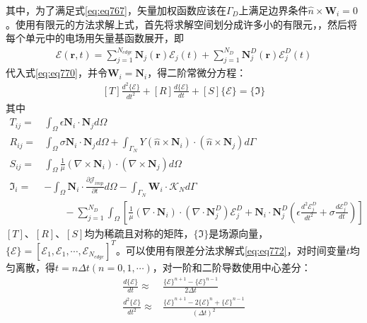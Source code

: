 \documentclass{article}
\numberwithin{equation}{section}
\renewcommand{\vec}[1]{\boldsymbol{#1}}
\begin{document}
其中，为了满足式\ref{eq:eq767}，矢量加权函数应该在$\Gamma_D$上满足边界条件$\hat{n}\times\mathbf{W}_i=0$。使用有限元的方法求解上式，首先将求解空间划分成许多小的有限元，，然后将每个单元中的电场用矢量基函数展开，即
\begin{align}
    \label{eq:eq771}
    \vec{\mathcal{E}}(\vec{r},t)=\sum_{j=1}^{N_{edge}}\mathbf{N}_j(\vec{r})\mathcal{E}_j(t)+\sum_{j=1}^{N_{D}}\mathbf{N}^D_j(\vec{r})\mathcal{E}^D_j(t)
\end{align}
代入式\ref{eq:eq770}，并令$\mathbf{W}_i=\mathbf{N}_i$，得二阶常微分方程：
\begin{align}
    \label{eq:eq772}
    [T]\frac{d^2\{\mathcal{E}\}}{dt^2}+[R]\frac{d\{\mathcal{E}\}}{dt}+[S]\{\mathcal{E}\}=\{\mathfrak{I}\}
\end{align}
其中
\begin{align}
    \label{eq:eq773}
    T_{ij}=&\int_{\Omega}\epsilon\mathbf{N}_i\cdot\mathbf{N}_jd\Omega \\
    \label{eq:eq784}
    R_{ij}=&\int_{\Omega}\sigma\mathbf{N}_i\cdot\mathbf{N}_jd\Omega+\int_{\Gamma_N}Y(\hat{n}\times\mathbf{N}_i)\cdot(\hat{n}\times\mathbf{N}_j)d\Gamma \\
    \label{eq:eq785}
    S_{ij}=&\int_{\Omega}\frac{1}{\mu}(\nabla\times\mathbf{N}_i)\cdot(\nabla\times\mathbf{N}_j)d\Omega \\
    \label{eq:eq786}
    \mathfrak{I}_{i}=&-\int_{\Omega}\mathbf{N}_i\cdot\frac{\partial\vec{\mathcal{J}}_{imp}}{\partial t}d\Omega-\int_{\Gamma_N}\mathbf{W}_i\cdot\vec{\mathcal{K}}_Nd\Gamma \nonumber \\
                     &\qquad-\sum_{j=1}^{N_D}\int_{\Omega}\left[\frac{1}{\mu}\left(\nabla\cdot\mathbf{N}_i\right)\cdot\left(\nabla\cdot\mathbf{N}_j^D\right)\mathcal{E}_j^D+\mathbf{N}_i\cdot\mathbf{N}_j^D\left(\epsilon\frac{d^2\mathcal{E}_j^D}{dt^2}+\sigma\frac{d\mathcal{E}_j^D}{dt}\right)\right]
\end{align}
$[T]$、$[R]$、$[S]$均为稀疏且对称的矩阵，$\{\mathfrak{I}\}$是场源向量，$\{\mathcal{E}\}=[\mathcal{E}_1,\mathcal{E}_1,\cdots,\mathcal{E}_{N_{edge}}]^T$。可以使用有限差分法求解式\ref{eq:eq772}，对时间变量$t$均匀离散，得$t=n\Delta t(n=0,1,\cdots)$，对一阶和二阶导数使用中心差分：
\begin{align}
    \label{eq:eq774}
    \frac{d\{\mathcal{E}\}}{dt}\approx&\frac{\{\mathcal{E}\}^{n+1}-\{\mathcal{E}\}^{n-1}}{2\Delta t} \\
    \label{eq:eq775}
    \frac{d^2\{\mathcal{E}\}}{dt^2}\approx&\frac{\{\mathcal{E}\}^{n+1}-2\{\mathcal{E}\}^{n}+\{\mathcal{E}\}^{n-1}}{(\Delta t)^2}
\end{align}
\end{document}
